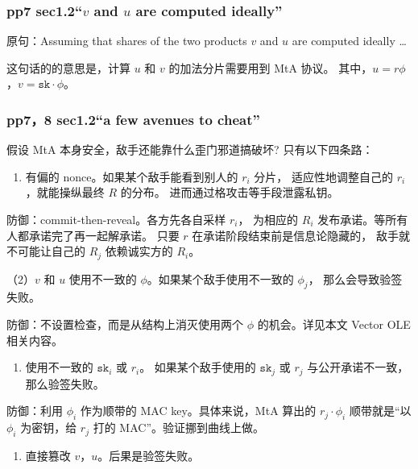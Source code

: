 \subsubsection{\texorpdfstring{pp7 sec1.2“$v$ and $u$ are computed ideally”}{pp7 sec1.2“vanduare computed ideally”}}\label{pp7-sec1.2-vanduare-computed-ideally}

原句：Assuming that shares of the two products $v$ and $u$ are computed
ideally \ldots{}

这句话的的意思是，计算 $u$ 和 $v$ 的加法分片需要用到 MtA 协议。
其中，$u = r\phi$，$v = \mathtt{sk}\cdot\phi$。

\subsubsection{pp7，8 sec1.2“a few avenues to cheat”}\label{pp78-sec1.2-a-few-avenues-to-cheat}

假设 MtA 本身安全，敌手还能靠什么歪门邪道搞破坏? 只有以下四条路：

\begin{enumerate}
\def\labelenumi{(\arabic{enumi})}

\item
  有偏的 nonce。如果某个敌手能看到别人的 $r_i$ 分片，
  适应性地调整自己的 $r_i$，就能操纵最终 $R$ 的分布。
  进而通过格攻击等手段泄露私钥。
\end{enumerate}

防御：commit-then-reveal。各方先各自采样 $r_i$，
为相应的 $R_i$ 发布承诺。等所有人都承诺完了再一起解承诺。
只要 $r$ 在承诺阶段结束前是信息论隐藏的，
敌手就不可能让自己的 $R_j$ 依赖诚实方的 $R_i$。

（2）$v$ 和 $u$ 使用不一致的 $\phi$。如果某个敌手使用不一致的 $\phi_j$，
那么会导致验签失败。

防御：不设置检查，而是从结构上消灭使用两个 $\phi$ 的机会。详见本文
Vector OLE 相关内容。

\begin{enumerate}
\def\labelenumi{(\arabic{enumi})}
\setcounter{enumi}{2}

\item
  使用不一致的 $\mathtt{sk}_i$ 或 $r_i$。
  如果某个敌手使用的 $\mathtt{sk}_j$ 或 $r_j$ 与公开承诺不一致，
  那么验签失败。
\end{enumerate}

防御：利用 $\phi_i$ 作为顺带的 MAC key。具体来说，MtA
算出的 $r_j \cdot \phi_i$ 顺带就是“以 $\phi_i$ 为密钥，给 $r_j$ 打的
MAC”。验证挪到曲线上做。

\begin{enumerate}
\def\labelenumi{(\arabic{enumi})}
\setcounter{enumi}{3}

\item
  直接篡改 $v$，$u$。后果是验签失败。
\end{enumerate}

